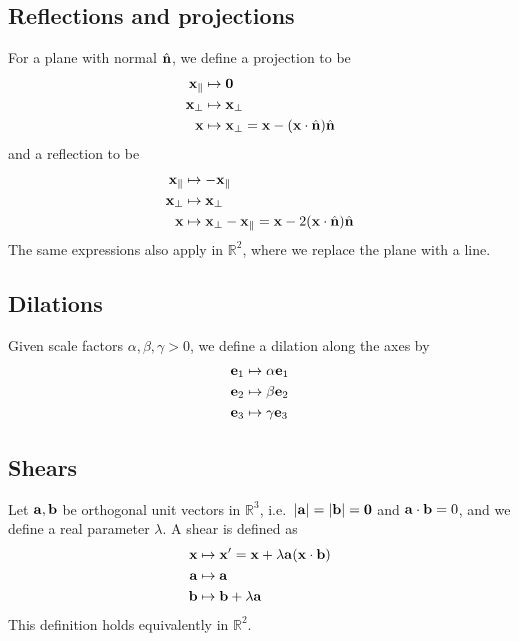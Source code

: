 \subsection{Reflections and projections}
For a plane with normal \(\hat{\vb{n}}\), we define a projection to be
\begin{align*}
	\vb x_\parallel & \mapsto \vb 0                                           \\
	\vb x_\perp     & \mapsto \vb x_\perp                                     \\
	\vb x           & \mapsto \vb x_\perp = \vb x - (\vb x \cdot \hat{\vb{n}}) \hat{\vb{n}}
\end{align*}
and a reflection to be
\begin{align*}
	\vb x_\parallel & \mapsto -\vb x_\parallel                                                   \\
	\vb x_\perp     & \mapsto \vb x_\perp                                                        \\
	\vb x           & \mapsto \vb x_\perp - \vb x_\parallel = \vb x - 2(\vb x \cdot \hat{\vb{n}}) \hat{\vb{n}}
\end{align*}
The same expressions also apply in \(\mathbb R^2\), where we replace the plane with a line.

\subsection{Dilations}
Given scale factors \(\alpha, \beta, \gamma > 0\), we define a dilation along the axes by
\begin{align*}
	\vb e_1 & \mapsto \alpha \vb e_1 \\
	\vb e_2 & \mapsto \beta \vb e_2  \\
	\vb e_3 & \mapsto \gamma \vb e_3
\end{align*}

\subsection{Shears}
Let \(\vb a, \vb b\) be orthogonal unit vectors in \(\mathbb R^3\), i.e.\ \(\abs{\vb a} = \abs{\vb b} = \vb 0\) and \(\vb a \cdot \vb b = 0\), and we define a real parameter \(\lambda\).
A shear is defined as
\begin{align*}
	\vb x & \mapsto \vb x' = \vb x + \lambda \vb a (\vb x \cdot \vb b) \\
	\vb a & \mapsto \vb a                                              \\
	\vb b & \mapsto \vb b + \lambda \vb a
\end{align*}
This definition holds equivalently in \(\mathbb R^2\).

